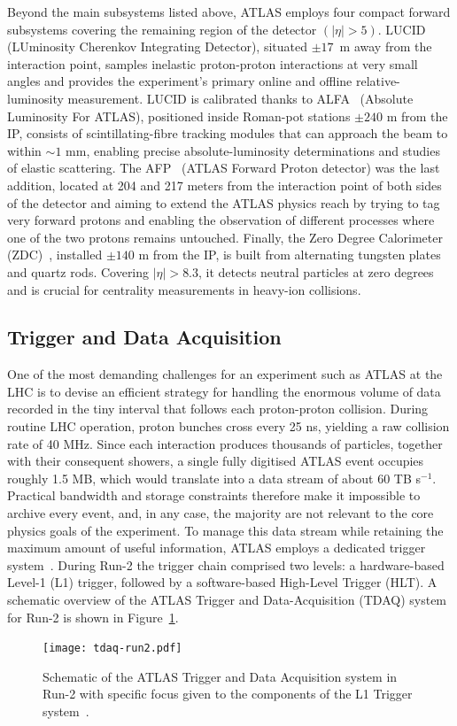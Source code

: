 Beyond the main subsystems listed above, ATLAS employs four compact forward subsystems covering the remaining region of the detector $(|\eta| > 5)$.
LUCID~\cite{Jenni:721908} (LUminosity Cherenkov Integrating Detector), situated $\pm17$~m away from the interaction point, samples inelastic proton-proton interactions at very small angles and provides the experiment’s primary online and offline relative-luminosity measurement.  
LUCID is calibrated thanks to ALFA~\cite{Khalek_2016} (Absolute Luminosity For ATLAS), positioned inside Roman-pot stations $\pm240$ m from the IP, consists of scintillating-fibre tracking modules that can approach the beam to within $\sim\!1$ mm, enabling precise absolute-luminosity determinations and studies of elastic scattering.  
The AFP~\cite{Adamczyk:2015cjy} (ATLAS Forward Proton detector) was the last addition, located at 204 and 217 meters from the interaction point of both sides of the detector and aiming to extend the ATLAS physics reach by trying to tag very forward protons and enabling the observation of different processes where one of the two protons remains untouched.
Finally, the Zero Degree Calorimeter (ZDC)~\cite{Jenni:1009649}, installed $\pm140$ m from the IP, is built from alternating tungsten plates and quartz rods.  Covering $|\eta| > 8.3$, it detects neutral particles at zero degrees and is crucial for centrality measurements in heavy-ion collisions.

\subsection{Trigger and Data Acquisition}
\label{sec:trigger}
One of the most demanding challenges for an experiment such as ATLAS at the LHC is to devise an efficient strategy for handling the enormous volume of data recorded in the tiny interval that follows each proton-proton collision. During routine LHC operation, proton bunches cross every 25 ns, yielding a raw collision rate of 40 MHz. Since each interaction produces thousands of particles, together with their consequent showers, a single fully digitised ATLAS event occupies roughly 1.5 MB, which would translate into a data stream of about 60 TB s$^{-1}$. Practical bandwidth and storage constraints therefore make it impossible to archive every event, and, in any case, the majority are not relevant to the core physics goals of the experiment. To manage this data stream while retaining the maximum amount of useful information, ATLAS employs a dedicated trigger system~\cite{trigger_run2}. During Run-2 the trigger chain comprised two levels: a hardware-based Level-1 (L1) trigger, followed by a software-based High-Level Trigger (HLT). A schematic overview of the ATLAS Trigger and Data-Acquisition (TDAQ) system for Run-2 is shown in Figure~\ref{fig:trigger_system}.
\begin{figure}[htbp]
    \centering
        \texttt{[image: tdaq-run2.pdf]}
    \caption{Schematic of the ATLAS Trigger and Data Acquisition system in Run-2 with specific focus given to the components of the L1 Trigger system~\cite{atlas_daq_run2}.}
    \label{fig:trigger_system}
\end{figure}

